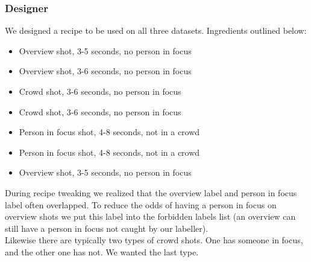 \subsubsection{Designer}
We designed a recipe to be used on all three datasets. Ingredients outlined below:
\begin{itemize}
\item Overview shot, 3-5 seconds, no person in focus
\item Overview shot, 3-6 seconds, no person in focus
\item Crowd shot, 3-6 seconds, no person in focus
\item Crowd shot, 3-6 seconds, no person in focus
\item Person in focus shot, 4-8 seconds, not in a crowd
\item Person in focus shot, 4-8 seconds, not in a crowd
\item Overview shot, 3-5 seconds, no person in focus
\end{itemize}
%
During recipe tweaking we realized that the overview label and person in focus label often overlapped. To reduce the odds of having a person in focus on overview shots we put this label into the forbidden labels list (an overview can still have a person in focus not caught by our labeller).\\
Likewise there are typically two types of crowd shots. One has someone in focus, and the other one has not. We wanted the last type.
